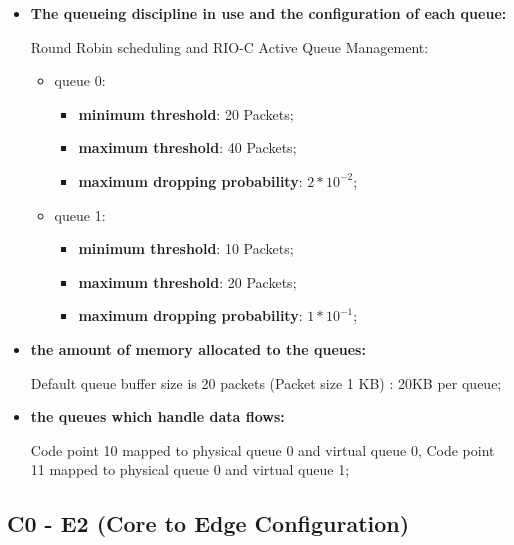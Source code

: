 \documentclass[conference,compsoc]{IEEEtran}
\begin{document}
\begin{itemize}
        \vspace{5mm}
        \item \textbf{The queueing discipline in use and the configuration of each queue:}\par
        Round Robin scheduling and RIO-C Active Queue Management: \par 
        \begin{itemize}
            \item queue 0:
            \begin{itemize}
                \item \textbf{minimum threshold}: 20 Packets;
                \item \textbf{maximum threshold}: 40 Packets;
                \item \textbf{maximum dropping probability}: $2 * 10^{-2}$;
            \end{itemize}
            \item queue 1:
             \begin{itemize}
                \item \textbf{minimum threshold}: 10 Packets;
                \item \textbf{maximum threshold}: 20 Packets;
                \item \textbf{maximum dropping probability}:  $1 * 10^{-1}$;
            \end{itemize}
        \end{itemize}
        
        \vspace{5mm}
        \item \textbf{the amount of memory allocated to the queues:}\par
        
        Default queue buffer size is 20 packets (Packet size 1 KB) : 20KB per queue;
        
        
        \vspace{5mm}
        \item \textbf{the queues which handle data flows:}\par
        Code point 10 mapped to physical queue 0 and virtual queue 0, Code point 11 mapped to physical queue 0 and virtual queue 1;
        
    \end{itemize}
    
    \subsection{C0 - E2 (Core to Edge Configuration)}
    
\end{document}
